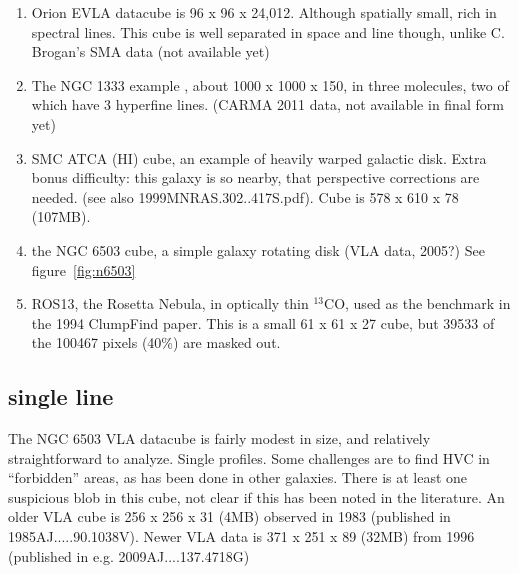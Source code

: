 \documentclass[preprint]{aastex} %
\begin{document}
\begin{enumerate}

\item Orion EVLA datacube is 96 x 96 x 24,012. Although spatially small, rich in spectral lines. 
This
cube is well separated in space and line though, unlike C. Brogan's SMA data (not available yet)


\item The NGC 1333 example , about 1000 x 1000 x 150, in three molecules, two of which have 3 hyperfine lines. (CARMA 2011 data, not available in final form yet)

\item SMC ATCA (HI) cube, an example of heavily warped galactic disk.  Extra bonus difficulty: this
galaxy is so nearby, that perspective corrections are needed. (see also 1999MNRAS.302..417S.pdf).
Cube is 578 x 610 x 78 (107MB).

\item the NGC 6503 cube, a simple galaxy rotating disk  (VLA data, 2005?) See figure~\ref{fig:n6503}

\item ROS13, the Rosetta Nebula, in optically thin $^{13}$CO, used as the benchmark
in the 1994 ClumpFind paper.  This is a small 61 x 61 x 27 cube, but 39533 of the
100467 pixels (40\%) are masked out.




\end{enumerate}


\subsection{single line}

The NGC 6503 VLA datacube is fairly modest in size, and relatively straightforward 
to analyze. Single profiles. Some challenges are to find HVC in ``forbidden'' areas,
as has been done in other galaxies. There is at least one suspicious blob in this
cube, not clear if this has been noted in the literature.  
An older VLA cube is 256 x 256 x 31 (4MB) observed in 1983 (published in 1985AJ.....90.1038V).
Newer VLA data is 371 x 251 x 89 (32MB) from 1996 (published in e.g. 2009AJ....137.4718G)
\end{document}
